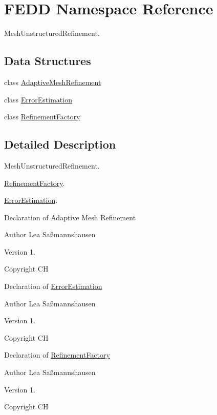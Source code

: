 \hypertarget{namespaceFEDD}{}\section{F\+E\+DD Namespace Reference}
\label{namespaceFEDD}


Mesh\+Unstructured\+Refinement.  


\subsection*{Data Structures}
\begin{DoxyCompactItemize}
\item 
class \hyperlink{classFEDD_1_1AdaptiveMeshRefinement}{Adaptive\+Mesh\+Refinement}
\item 
class \hyperlink{classFEDD_1_1ErrorEstimation}{Error\+Estimation}
\item 
class \hyperlink{classFEDD_1_1RefinementFactory}{Refinement\+Factory}
\end{DoxyCompactItemize}


\subsection{Detailed Description}
Mesh\+Unstructured\+Refinement. 

\hyperlink{classFEDD_1_1RefinementFactory}{Refinement\+Factory}.

\hyperlink{classFEDD_1_1ErrorEstimation}{Error\+Estimation}.

Declaration of Adaptive Mesh Refinement

\begin{DoxyAuthor}{Author}
Lea Saßmannshausen 
\end{DoxyAuthor}
\begin{DoxyVersion}{Version}
1. 
\end{DoxyVersion}
\begin{DoxyCopyright}{Copyright}
CH
\end{DoxyCopyright}
Declaration of \hyperlink{classFEDD_1_1ErrorEstimation}{Error\+Estimation}

\begin{DoxyAuthor}{Author}
Lea Saßmannshausen 
\end{DoxyAuthor}
\begin{DoxyVersion}{Version}
1. 
\end{DoxyVersion}
\begin{DoxyCopyright}{Copyright}
CH
\end{DoxyCopyright}
Declaration of \hyperlink{classFEDD_1_1RefinementFactory}{Refinement\+Factory}

\begin{DoxyAuthor}{Author}
Lea Saßmannshausen 
\end{DoxyAuthor}
\begin{DoxyVersion}{Version}
1. 
\end{DoxyVersion}
\begin{DoxyCopyright}{Copyright}
CH 
\end{DoxyCopyright}
